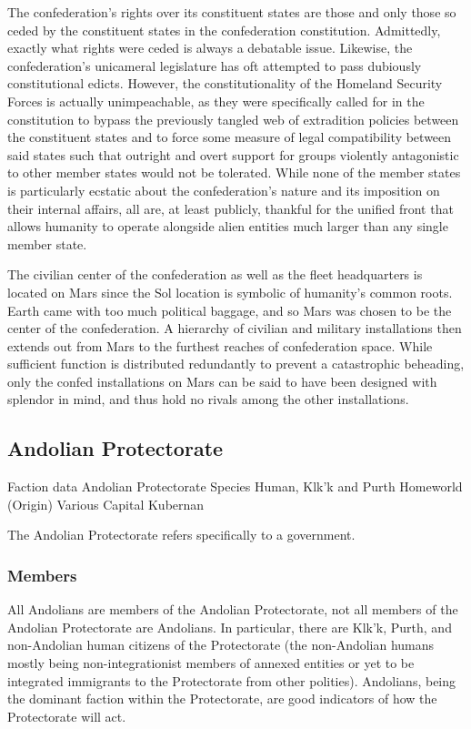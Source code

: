 The confederation's rights over its constituent states are those and
only those so ceded by the constituent states in the confederation
constitution. Admittedly, exactly what rights were ceded is always a
debatable issue. Likewise, the confederation's unicameral legislature
has oft attempted to pass dubiously constitutional edicts. However,
the constitutionality of the Homeland Security Forces is actually
unimpeachable, as they were specifically called for in the
constitution to bypass the previously tangled web of extradition
policies between the constituent states and to force some measure of
legal compatibility between said states such that outright and overt
support for groups violently antagonistic to other member states would
not be tolerated. While none of the member states is particularly
ecstatic about the confederation's nature and its imposition on their
internal affairs, all are, at least publicly, thankful for the unified
front that allows humanity to operate alongside alien entities much
larger than any single member state.

The civilian center of the confederation as well as the fleet
headquarters is located on Mars since the Sol location is symbolic of
humanity's common roots. Earth came with too much political baggage,
and so Mars was chosen to be the center of the confederation. A
hierarchy of civilian and military installations then extends out from
Mars to the furthest reaches of confederation space. While sufficient
function is distributed redundantly to prevent a catastrophic
beheading, only the confed installations on Mars can be said to have
been designed with splendor in mind, and thus hold no rivals among the
other installations.




\subsection{Andolian Protectorate}

Faction data 
Andolian Protectorate 
Species 	Human, Klk'k and Purth 
Homeworld (Origin) 	Various 
Capital 	Kubernan 

The Andolian Protectorate refers specifically to a government. 

\subsubsection{Members}

All Andolians are members of the Andolian Protectorate, not all
members of the Andolian Protectorate are Andolians. In particular,
there are Klk'k, Purth, and non-Andolian human citizens of the
Protectorate (the non-Andolian humans mostly being non-integrationist
members of annexed entities or yet to be integrated immigrants to the
Protectorate from other polities). Andolians, being the dominant
faction within the Protectorate, are good indicators of how the
Protectorate will act.

